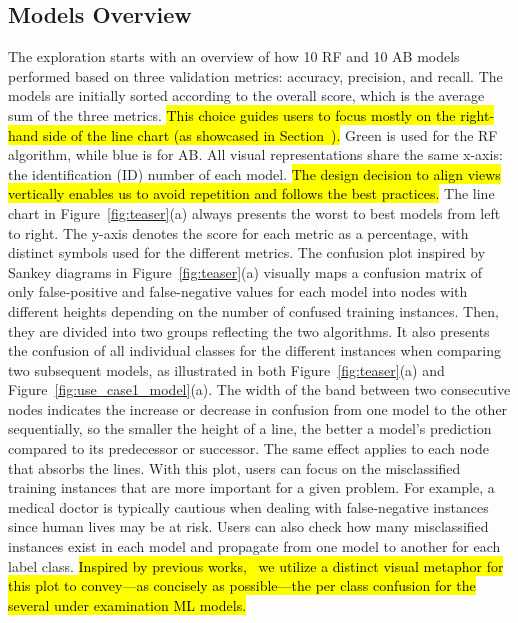 \subsection{Models Overview} \label{sec:models}

The exploration starts with an overview of how 10 RF and 10 AB models performed based on three validation metrics: accuracy, precision, and recall. The models are initially sorted according to the overall score, which is the average sum of the three metrics. \hl{This choice guides users to focus mostly on the right-hand side of the line chart (as showcased in Section~).} Green is used for the RF algorithm, while blue is for AB. All visual representations share the same x-axis: the identification (ID) number of each model. \hl{The design decision to align views vertically enables us to avoid repetition and follows the best practices.} The line chart in Figure~\ref{fig:teaser}(a) always presents the worst to best models from left to right. The y-axis denotes the score for each metric as a percentage, with distinct symbols used for the different metrics. 
The confusion plot inspired by Sankey diagrams in Figure~\ref{fig:teaser}(a) visually maps a confusion matrix of only false-positive and false-negative values for each model into nodes with different heights depending on the number of confused training instances. Then, they are divided into two groups reflecting the two algorithms. It also presents the confusion of all individual classes for the different instances when comparing two subsequent models, as illustrated in both Figure~\ref{fig:teaser}(a) and Figure~\ref{fig:use_case1_model}(a). The width of the band between two consecutive nodes indicates the increase or decrease in confusion from one model to the other sequentially, so the smaller the height of a line, the better a model's prediction compared to its predecessor or successor. The same effect applies to each node that absorbs the lines. With this plot, users can focus on the misclassified training instances that are more important for a given problem. For example, a medical doctor is typically cautious when dealing with false-negative instances since human lives may be at risk. Users can also check how many misclassified instances exist in each model and propagate from one model to another for each label class. \hl{Inspired by previous works,~\cite{Liu2018Visual,Wang2021Investigating} we utilize a distinct visual metaphor for this plot to convey---as concisely as possible---the per class confusion for the several under examination ML models.}
